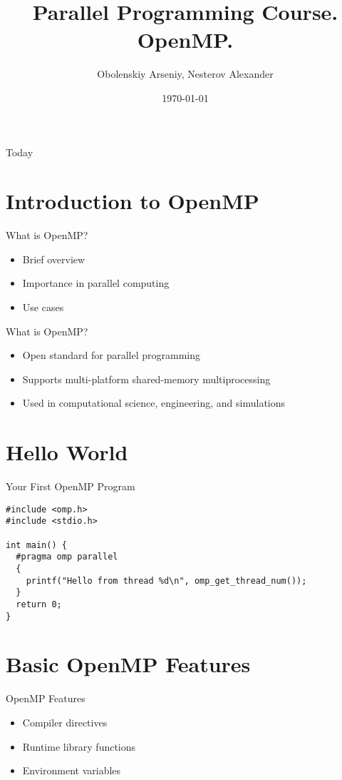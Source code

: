 \documentclass{beamer}
\title[Parallel Programming Course. OpenMP.]{Parallel Programming Course. \\OpenMP.}
\author{Obolenskiy Arseniy, Nesterov Alexander}
\institute{Nizhny Novgorod State University}
\date{\today} %
\begin{document}
\begin{frame}
  \titlepage
\end{frame}

\begin{frame}{Today}
  \tableofcontents
\end{frame}

\section{Introduction to OpenMP}
\begin{frame}{What is OpenMP?}
  \begin{itemize}
    \item Brief overview
    \item Importance in parallel computing
    \item Use cases
  \end{itemize}
\end{frame}

\begin{frame}{What is OpenMP?}
  \begin{itemize}
    \item Open standard for parallel programming
    \item Supports multi-platform shared-memory multiprocessing
    \item Used in computational science, engineering, and simulations
  \end{itemize}
\end{frame}

\section{Hello World}
\begin{frame}[fragile]{Your First OpenMP Program}
  \lstset{style=CStyle}
  \begin{lstlisting}
#include <omp.h>
#include <stdio.h>

int main() {
  #pragma omp parallel
  {
    printf("Hello from thread %d\n", omp_get_thread_num());
  }
  return 0;
}
  \end{lstlisting}
\end{frame}

\section{Basic OpenMP Features}
\begin{frame}{OpenMP Features}
    \begin{itemize}
      \item Compiler directives
      \item Runtime library functions
      \item Environment variables
    \end{itemize}
\end{frame}
\end{document}

